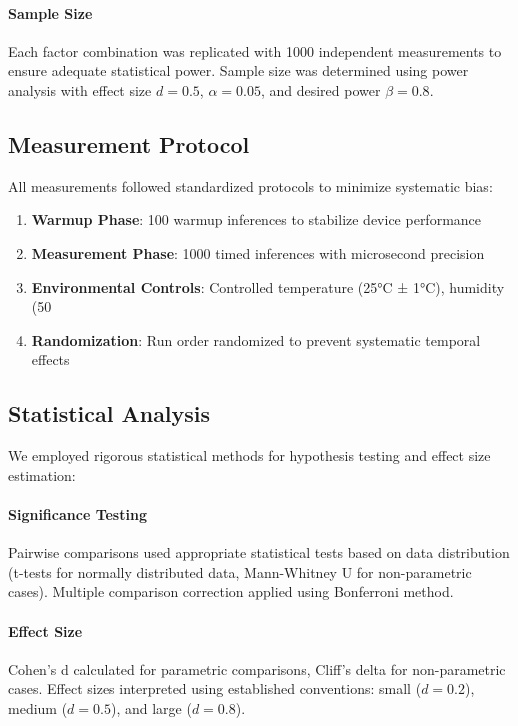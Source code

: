 \documentclass[conference]{IEEEtran}
\begin{document}
\paragraph{Sample Size} Each factor combination was replicated with 1000 independent measurements to ensure adequate statistical power. Sample size was determined using power analysis with effect size $d = 0.5$, $\alpha = 0.05$, and desired power $\beta = 0.8$.

\subsection{Measurement Protocol}

All measurements followed standardized protocols to minimize systematic bias:

\begin{enumerate}
\item \textbf{Warmup Phase}: 100 warmup inferences to stabilize device performance
\item \textbf{Measurement Phase}: 1000 timed inferences with microsecond precision
\item \textbf{Environmental Controls}: Controlled temperature (25°C ± 1°C), humidity (50%
\item \textbf{Randomization}: Run order randomized to prevent systematic temporal effects
\end{enumerate}

\subsection{Statistical Analysis}

We employed rigorous statistical methods for hypothesis testing and effect size estimation:

\paragraph{Significance Testing} Pairwise comparisons used appropriate statistical tests based on data distribution (t-tests for normally distributed data, Mann-Whitney U for non-parametric cases). Multiple comparison correction applied using Bonferroni method.

\paragraph{Effect Size} Cohen's d calculated for parametric comparisons, Cliff's delta for non-parametric cases. Effect sizes interpreted using established conventions: small ($d = 0.2$), medium ($d = 0.5$), and large ($d = 0.8$).
\end{document}
